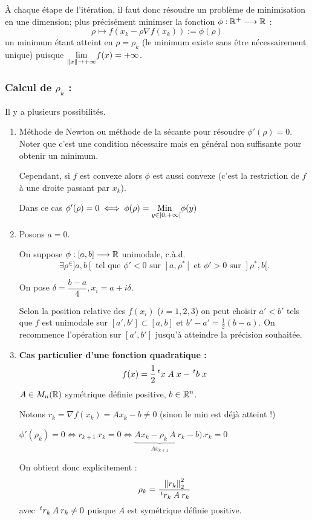 À chaque étape de l'itération, il faut donc résoudre un problème de minimisation
en une dimension; plus précisément minimser la fonction $\phi : \mathbb{R}^+ \longrightarrow \mathbb{R}$ :
\[
    \rho \mapsto f(x_k - \rho \nabla f(x_k) ) := \phi (\rho)
\]
un minimum étant atteint en $\rho = \rho_k$ (le minimum existe sans être
nécessairement unique) puisque $\underset{\left\lVert x\right\rVert \to +\infty}{\lim} f(x) = +\infty$.

\subsubsection*{Calcul de $\rho_k$ :}
Il y a plusieurs possibilités.
\begin{enumerate}[label=•]
    \item Méthode de Newton ou méthode de la sécante pour résoudre
        $\phi'(\rho) = 0$. Noter que c'est une condition nécessaire mais
        en général non suffisante pour obtenir un minimum.

        Cependant, si $f$ est convexe alors $\phi$ est aussi convexe (c'est
        la restriction de $f$ à une droite passant par $x_k$).

    Dans ce cas $\phi'(\rho) = 0 \iff \phi(\rho) = \underset{y \in ]0,+\infty[}{\text{Min }}{\phi(y)}$

    \item Posons $a = 0$.
        
        On suppose $\phi : [a,b] \longrightarrow \mathbb{R}$ unimodale, c.à.d. 
        \[
            \exists \rho^
        \in ]a,b[ \text{ tel que } \phi' < 0 \text{ sur } ]a,\rho^*[ \text{ et } \phi' > 0 
        \text{ sur } ]\rho^*, b[. 
        \]
        
        On pose $\delta = \dfrac{b-a}{4}, x_i = a + i\delta$.

        Selon la position relative des $f(x_i)$ ($i = 1,2,3$) on peut choisir
        $a' < b'$ tels que $f$ est unimodale sur $[a',b'] \subset [a,b]$ et
        $b' - a' = \frac{1}{2} (b - a)$. On recommence l'opération sur
        $[a',b']$ jusqu'à atteindre la précision souhaitée.


    \item \textbf{Cas particulier d'une fonction quadratique :}
        \[
            f(x) = \frac{1}{2} \,^tx \; A \; x - \,^tb \; x
        \]
    $A \in M_n(\mathbb{R})$ symétrique définie positive, $b \in \mathbb{R}^n$.

    Notons $r_k = \nabla f(x_k) = A x_k - b \neq 0$ (sinon le min
    est déjà atteint !)

    $\phi'(\rho_k) = 0 \iff r_{k+1} . r_k = 0 \iff \underbrace{A x_k - \rho_k \: A \: r_k }_{Ax_{k+1}} - b) . r_k = 0$

    On obtient donc explicitement : 
    \[
        \rho_k = \frac{\left\lVert r_k\right\rVert^2_2}{\,^tr_k \: A \: r_k}
    \]
    avec $\,^tr_k \: A \: r_k \neq 0$ puisque $A$ est symétrique définie
    positive.
\end{enumerate}

